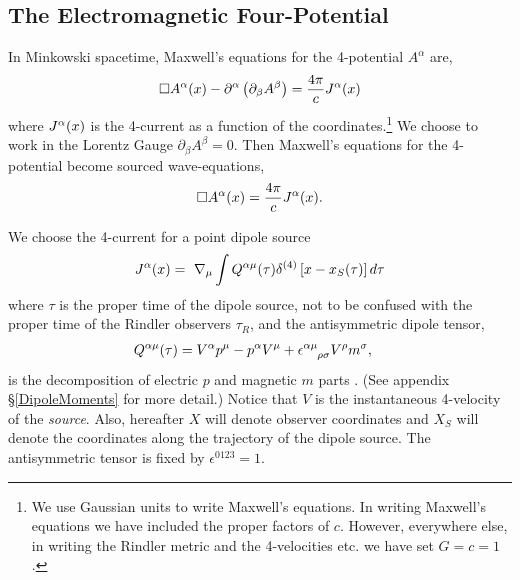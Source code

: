 \subsection{The Electromagnetic Four-Potential}
In Minkowski spacetime, Maxwell's equations for the 4-potential $A^{\alpha}$ are,
\begin{equation}
\Box A^{\alpha}({x}) - \partial^{\alpha} \left( \partial_{\beta} A^{\beta} \right)= \frac{4 \pi}{c}  J^{\alpha}({x})
\label{MxPotMink1}
\end{equation}
where $J^{\alpha}({x})$ is the 4-current as a function of the
coordinates.\footnote{We use Gaussian units to write Maxwell's equations. In writing Maxwell's equations we have included the proper factors of $c$. However, everywhere else, in writing the Rindler metric and the 4-velocities etc. we have set $G=c=1$.}
We choose to work in the Lorentz Gauge $  \partial_{\beta} A^{\beta}
= 0$. Then Maxwell's equations for the 4-potential become sourced
wave-equations,
\begin{equation}
\Box A^{\alpha}({x}) = \frac{4 \pi}{c} J^{\alpha}({x}).
\label{MxPotMinkL}
\end{equation}


We choose the 4-current for a point dipole source
\begin{align}
J^{\alpha}({x}) =  \hbox{  } \nabla_{\mu} \int { Q^{\alpha \mu}(\tau) \delta^{(4)}\left[ {x} -{x_S}(\tau) \right]   d \tau}
\label{eq:4JDipole}
\end{align}
where $\tau$ is the proper time of the dipole source, not to be confused with the proper time of the Rindler observers $\tau_R$, and the antisymmetric dipole tensor,
\begin{align}
Q^{\alpha \mu}(\tau) &= V^{\alpha}p^{\mu} - p^{\alpha}V^{\mu} + \epsilon^{\alpha \mu}_{ \hbox{  } \hbox{  } \hbox{  }\rho \sigma} V^{\rho} m^{\sigma},
\label{DipoleTensor}
\end{align}
is the decomposition of electric $p$ and magnetic $m$ parts
\citep{RS:1995, Rowe2:1986}. (See appendix \S \ref{DipoleMoments} for more detail.) Notice that $V$ is the
instantaneous 4-velocity of the {\it source}. 
Also, hereafter $X$ will denote observer coordinates and $X_S$ will denote the
coordinates along the trajectory of the dipole source. 
The antisymmetric tensor is fixed by $\epsilon^{0123}=1$.

